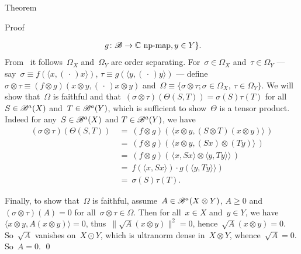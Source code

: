 \documentclass[b]{subfiles}
\begin{document}
\begin{parsec}
\begin{point}{Theorem}
\begin{point}{Proof}
\begin{point}
\begin{point}
\begin{align*}
                    \ g \colon \mathscr{B} \to \mathbb{C} \text{ np-map}, y\in Y \}.
    \end{align*}
From~
    it follows~$\Omega_X$  and~$\Omega_Y$ are order separating.
For~$\sigma \in \Omega_X$ and~$\tau \in \Omega_Y$
 --- say~$\sigma \equiv f(\langle x, (\,\cdot\,) x\rangle)$,
    $\tau \equiv g(\langle y, (\,\cdot\,) y\rangle)$ ---
    define~$\sigma \otimes \tau \equiv
        (f \otimes g) (x \otimes y, (\,\cdot\,) x\otimes y) $
        and~$\Omega \equiv \{\sigma \otimes \tau; \sigma \in \Omega_X,
                    \ \tau \in \Omega_Y\}$.
We will show
    that~$\Omega$ is faithful
    and that~$(\sigma \otimes \tau)(\Theta(S,T)) = \sigma(S) \tau(T)$
    for all~$S \in \mathscr{B}^a(X)$ and~$T \in \mathscr{B}^a(Y)$,
    which is sufficient to show~$\Theta$ is a tensor product.
Indeed for any~$S \in \mathscr{B}^a(X)$ and $T \in \mathscr{B}^a(Y)$, we have
\begin{align*}
    (\sigma \otimes \tau)(\Theta(S, T))
        &\ = \ (f \otimes g) (\, \langle x \otimes y, 
                (S \otimes T) (x \otimes y) \rangle\,)\\
        &\ = \ (f \otimes g) (\,\langle x \otimes y, 
                (S x) \otimes (T y)\rangle\,)\\
        &\ = \ (f \otimes g) (\,
            \langle x, Sx\rangle \otimes
            \langle y, Ty\rangle \rangle\,)\\
        &\ = \ 
            f(\langle x, Sx\rangle ) \cdot
            g(\langle y, Ty\rangle \rangle)\\
        &\ = \ 
            \sigma(S) \tau(T).
\end{align*}
\end{point}
\begin{point}%
Finally, to show that~$\Omega$ is faithful,
        assume~$A \in \mathscr{B}^a(X \otimes Y)$, $A \geq 0$
        and $(\sigma \otimes \tau)(A) = 0$
        for all~$\sigma \otimes \tau \in \Omega$.
Then for all~$x \in X$ and~$y \in Y$,
    we have~$\langle x\otimes y, A (x\otimes y)\rangle = 0$,
        thus~$\| \sqrt{A} (x \otimes y) \|^2 = 0$,
        hence~$\sqrt{A} (x \otimes y) = 0$.
So~$\sqrt{A}$ vanishes on~$X \odot Y$,
    which is ultranorm dense in~$X \otimes Y$,
    whence~$\sqrt{A} = 0$. So~$A = 0$.
\qed
\end{point}
\end{point}
\end{point}
\end{point}
\end{parsec}
\end{document}
